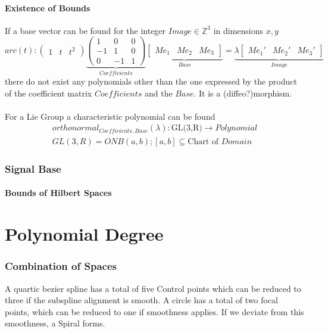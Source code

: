\documentclass[a4paper,landscape]{report}
\begin{document}
\subsubsection{Existence of Bounds}
If a base vector can be found for the integer $Image \in \mathbb{Z}^3$ in dimensions $x,y$
\begin{equation}
arc(t):
\begin{pmatrix}
1 & t & t^2
\end{pmatrix}
\underbrace{\begin{pmatrix}
1 & 0 & 0\\
-1 & 1 & 0\\
0 & -1 & 1
\end{pmatrix}}_{Coefficients}
\underbrace{\begin{bmatrix}
Me_{1} & Me_{2} & Me_{3}
\end{bmatrix}}_{Base}
=
\underbrace{
\lambda
\begin{bmatrix}
Me_{1}' & Me_{2}' & Me_{3}'
\end{bmatrix}}_{Image}
\end{equation}
there do not exist any polynomials other than the one expressed by the product of the coefficient matrix $Coefficients$ and the $Base$. It is a (diffeo?)morphism.\\\\
For a Lie Group a characteristic polynomial can be found
\begin{align}
orthonormal_{Coefficients,Base}(\lambda): \text{GL(3,R)} \rightarrow Polynomial\\
GL(3,R) = ONB(a,b); [a,b] \subseteq \text{Chart of }Domain
\end{align}
\subsection{Signal Base}
\subsubsection{Bounds of Hilbert Spaces}

\chapter{Polynomial Degree}
\subsection{Combination of Spaces}
A quartic bezier spline has a total of five Control points which can be reduced to three if the subspline alignment is smooth. A circle has a total of two focal points, which can be reduced to one if smoothness applies. If we deviate from this smoothness, a Spiral forms.
\end{document}

